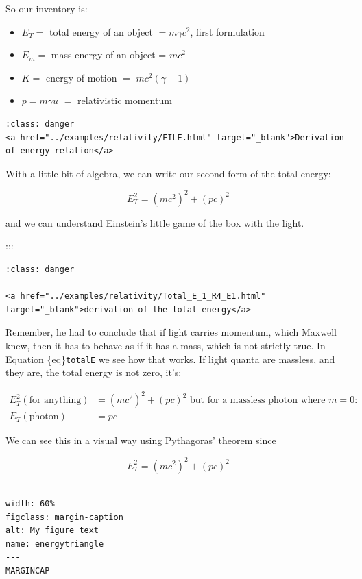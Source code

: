 \documentclass[
]{article}
\begin{document}
So our inventory is:

\begin{itemize}
\item
  \(E_T =\) total energy of an object \(= m\gamma c^2\), first
  formulation
\item
  \(E_m =\) mass energy of an object = \(mc^2\)
\item
  \(K =\) energy of motion \(=\) \(mc^2(\gamma -1)\)
\item
  \(p = m\gamma u\) \(=\) relativistic momentum
\end{itemize}

\begin{verbatim}
:class: danger
<a href="../examples/relativity/FILE.html" target="_blank">Derivation of energy relation</a>
\end{verbatim}

With a little bit of algebra, we can write our second form of the total
energy:

\[E_T^2 = (mc^2)^2 + (pc)^2\]

and we can understand Einstein's little game of the box with the light.

:::

\begin{verbatim}
:class: danger

<a href="../examples/relativity/Total_E_1_R4_E1.html" target="_blank">derivation of the total energy</a>
\end{verbatim}

Remember, he had to conclude that if light carries momentum, which
Maxwell knew, then it has to behave as if it has a mass, which is not
strictly true. In Equation \{eq\}\texttt{totalE} we see how that works.
If light quanta are massless, and they are, the total energy is not
zero, it's:

\begin{align*}
E_T^2(\text{for anything}) &= (mc^2)^2 + (pc)^2 \text{ but for a massless photon where } m=0: \\
E_T(\text{photon}) &= pc
\end{align*}

We can see this in a visual way using Pythagoras' theorem since

\[E_T^2 = (mc^2)^2 + (pc)^2  \nonumber\]

\begin{verbatim}
---
width: 60%
figclass: margin-caption
alt: My figure text
name: energytriangle
---
MARGINCAP
\end{verbatim}
\end{document}

